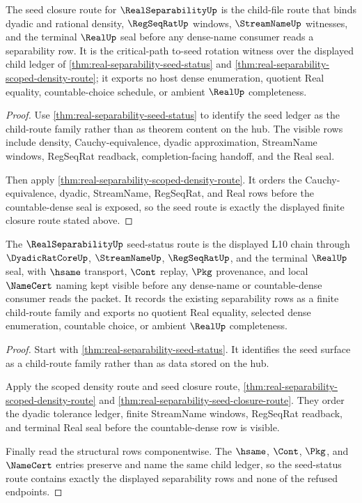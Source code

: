 \begin{theorem}
\label{thm:real-separability-seed-closure-route}
The seed closure route for $\RealSeparabilityUp$ is the child-file route that binds dyadic and rational density, $\RegSeqRatUp$ windows, $\StreamNameUp$ witnesses, and the terminal $\RealUp$ seal before any dense-name consumer reads a separability row. It is the critical-path to-seed rotation witness over the displayed child ledger of \autoref{thm:real-separability-seed-status} and \autoref{thm:real-separability-scoped-density-route}; it exports no host dense enumeration, quotient Real equality, countable-choice schedule, or ambient $\RealUp$ completeness.
\end{theorem}
\begin{proof}
Use \autoref{thm:real-separability-seed-status} to identify the seed ledger as the child-route family rather than as theorem content on the hub. The visible rows include density, Cauchy-equivalence, dyadic approximation, StreamName windows, RegSeqRat readback, completion-facing handoff, and the Real seal.

Then apply \autoref{thm:real-separability-scoped-density-route}. It orders the Cauchy-equivalence, dyadic, StreamName, RegSeqRat, and Real rows before the countable-dense seal is exposed, so the seed route is exactly the displayed finite closure route stated above.
\end{proof}

\begin{theorem}
\label{thm:real-separability-seed-status-route}
The $\RealSeparabilityUp$ seed-status route is the displayed L10 chain through $\DyadicRatCoreUp$, $\StreamNameUp$, $\RegSeqRatUp$, and the terminal $\RealUp$ seal, with $\hsame$ transport, $\Cont$ replay, $\Pkg$ provenance, and local $\NameCert$ naming kept visible before any dense-name or countable-dense consumer reads the packet. It records the existing separability rows as a finite child-route family and exports no quotient Real equality, selected dense enumeration, countable choice, or ambient $\RealUp$ completeness.
\end{theorem}
\begin{proof}
Start with \autoref{thm:real-separability-seed-status}. It identifies the seed surface as a child-route family rather than as data stored on the hub.

Apply the scoped density route and seed closure route, \autoref{thm:real-separability-scoped-density-route} and \autoref{thm:real-separability-seed-closure-route}. They order the dyadic tolerance ledger, finite StreamName windows, RegSeqRat readback, and terminal Real seal before the countable-dense row is visible.

Finally read the structural rows componentwise. The $\hsame$, $\Cont$, $\Pkg$, and $\NameCert$ entries preserve and name the same child ledger, so the seed-status route contains exactly the displayed separability rows and none of the refused endpoints.
\end{proof}

